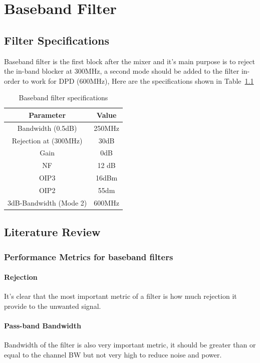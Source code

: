 \chapter{Baseband Filter}%
\section{Filter Specifications}%
Baseband filter is the first block after the mixer and it's 
main purpose is to reject the in-band blocker at 300MHz, a 
second mode should be added to the filter in-order to work 
for DPD (600MHz),
Here are the specifications shown in 
Table~\ref{tab:filter_specs} 
\begin{table}[htpb]
    \centering
    \caption{Baseband filter specifications}
    \label{tab:filter_specs}
    \begin{tabular}{|c|c|}
        \hline
        Parameter& Value  \\ \hline
        Bandwidth (0.5dB) & 250MHz \\ \hline
        Rejection at (300MHz) & 30dB \\ \hline
        Gain & 0dB \\ \hline
        NF  & 12 dB \\ \hline
        OIP3 & 16dBm \\ \hline
        OIP2 & 55dm \\ \hline
        3dB-Bandwidth (Mode 2) & 600MHz \\ \hline
    \end{tabular}
\end{table}


\section{Literature Review}%

\subsection{Performance Metrics for baseband filters}%
\subsubsection{Rejection}%
It's clear that the most important metric of a filter is 
how much rejection it provide to the unwanted signal.
\subsubsection{Pass-band Bandwidth}%
Bandwidth of the filter is also very important metric, it should 
be greater than or equal to the channel BW but not very high to
reduce noise and power.
